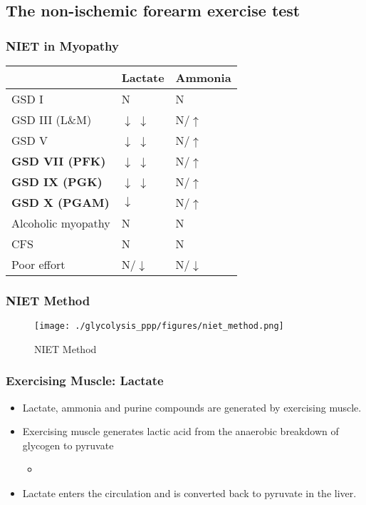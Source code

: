 \documentclass{scrartcl}
\begin{document}
\subsection{The non-ischemic forearm exercise test}
\label{sec:org9878259}
\subsubsection{NIET in Myopathy}
\label{sec:org5dca095}

\begin{center}
\begin{tabular}{lll}
 & Lactate & Ammonia\\
\hline
GSD I & N & N\\
GSD III (L\&M) & \(\downarrow\) \(\downarrow\) & N/\(\uparrow\)\\
GSD V & \(\downarrow\) \(\downarrow\) & N/\(\uparrow\)\\
\textbf{GSD VII (PFK)} & \(\downarrow\) \(\downarrow\) & N/\(\uparrow\)\\
\textbf{GSD IX (PGK)} & \(\downarrow\) \(\downarrow\) & N/\(\uparrow\)\\
\textbf{GSD X (PGAM)} & \(\downarrow\) & N/\(\uparrow\)\\
Alcoholic myopathy & N & N\\
CFS & N & N\\
Poor effort & N/\(\downarrow\) & N/\(\downarrow\)\\
\end{tabular}
\end{center}

\subsubsection{NIET Method}
\label{sec:orgec819cc}

\begin{figure}[htbp]
\centering
\texttt{[image: ./glycolysis\_ppp/figures/niet\_method.png]}
\caption{\label{fig:org778c083}
NIET Method}
\end{figure}


\subsubsection{Exercising Muscle: Lactate}
\label{sec:orgd9f940b}
\begin{itemize}
\item Lactate, ammonia and purine compounds are generated by exercising muscle.
\item Exercising muscle generates lactic acid from the anaerobic breakdown
of glycogen to pyruvate
\begin{itemize}
\item {}
\end{itemize}
\item Lactate enters the circulation and is converted back to pyruvate in the liver.
\end{itemize}
\end{document}
